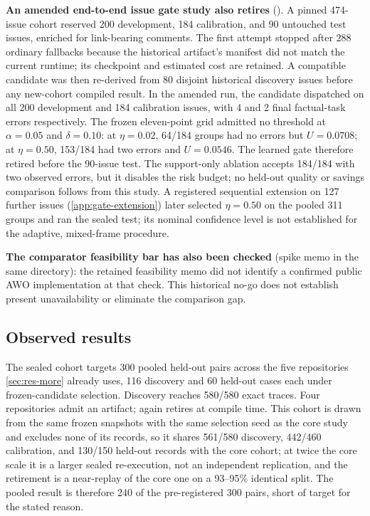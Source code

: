 \textbf{An amended end-to-end issue gate study also retires}
().
A pinned 474-issue cohort reserved 200 development, 184 calibration, and 90
untouched test issues, enriched for link-bearing comments. The first attempt
stopped after 288 ordinary fallbacks because the historical artifact's
manifest did not match the current runtime; its checkpoint and estimated cost
are retained. A compatible candidate was then re-derived from 80 disjoint
historical discovery issues before any new-cohort compiled result. In the
amended run, the candidate dispatched on all 200 development and 184
calibration issues, with 4 and 2 final factual-task errors respectively. The
frozen eleven-point grid admitted no threshold at $\alpha=0.05$ and
$\delta=0.10$: at $\eta=0.02$, 64/184 groups had no errors but
$U=0.0708$; at $\eta=0.50$, 153/184 had two errors and $U=0.0546$.
The learned gate therefore retired before the 90-issue test. The support-only
ablation accepts 184/184 with two observed errors, but it disables the risk
budget; no held-out quality or savings comparison follows from this study.
A registered sequential extension on 127 further issues (\cref{app:gate-extension})
later selected $\eta=0.50$ on the pooled 311 groups and ran the sealed test;
its nominal confidence level is not established for the adaptive, mixed-frame
procedure.

\textbf{The comparator feasibility bar has also been checked} (spike memo in the
same directory): the retained feasibility memo did not identify a confirmed public AWO
implementation \citep{abuzakuk2026awo} at that check. This historical no-go
does not establish present unavailability or eliminate the comparison gap.



\subsection{Observed results}

The sealed cohort targets 300 pooled held-out pairs across the five repositories
\cref{sec:res-more} already uses, 116 discovery and 60 held-out cases each
under frozen-candidate selection. Discovery reaches 580/580 exact traces. Four
repositories admit an artifact;  again retires at compile
time. This cohort is drawn from the same frozen snapshots with the same
selection seed as the core study and excludes none of its records, so it shares
561/580 discovery, 442/460 calibration, and 130/150 held-out records with the
core cohort; at twice the core scale it is a larger sealed re-execution, not an
independent replication, and the  retirement is a
near-replay of the core one on a 93--95\% identical split. The pooled result is
therefore 240 of the pre-registered 300 pairs, short of target for the stated
reason.

